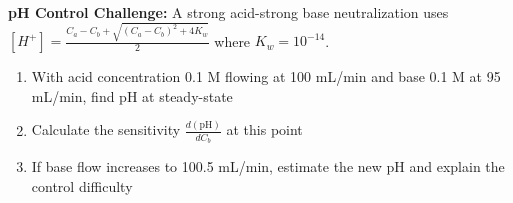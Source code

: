 \begin{exercise}
\textbf{pH Control Challenge:} A strong acid-strong base neutralization uses $[H^+] = \frac{C_a - C_b + \sqrt{(C_a - C_b)^2 + 4K_w}}{2}$ where $K_w = 10^{-14}$.
\begin{enumerate}[label=(\alph*)]
    \item With acid concentration 0.1 M flowing at 100 mL/min and base 0.1 M at 95 mL/min, find pH at steady-state
    \item Calculate the sensitivity $\frac{d(\text{pH})}{dC_b}$ at this point
    \item If base flow increases to 100.5 mL/min, estimate the new pH and explain the control difficulty
\end{enumerate}
\end{exercise}
